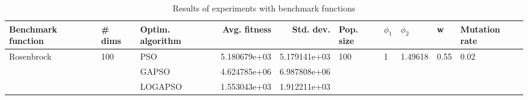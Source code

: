 \begin{table}
\centering
\caption{Results of experiments with benchmark functions}
\begin{tabular}{lllrrlllll}
\toprule
         Benchmark function &              \# dims & Optim. algorithm &  Avg. fitness &    Std. dev. &            Pop. size &         $\phi_{1}$ &               $\phi_{2}$ &                     w &         Mutation rate \\
\midrule
\multirow{3}{*}{Rosenbrock} & \multirow{3}{*}{100} &              PSO &  5.180679e+03 & 5.179141e+03 & \multirow{3}{*}{100} & \multirow{3}{*}{1} & \multirow{3}{*}{1.49618} & \multirow{3}{*}{0.55} & \multirow{3}{*}{0.02} \\
                            &                      &            GAPSO &  4.624785e+06 & 6.987808e+06 &                      &                    &                          &                       &                       \\
                            &                      &          LOGAPSO &  1.553043e+03 & 1.912211e+03 &                      &                    &                          &                       &                       \\
\bottomrule
\end{tabular}
\end{table}
